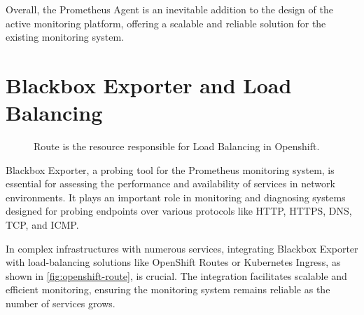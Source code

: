 Overall, the Prometheus Agent is an inevitable addition to the design of the active monitoring platform, offering a scalable and reliable solution for the existing monitoring system.

\section{Blackbox Exporter and Load Balancing}

\begin{figure}[htpb]
  \centering
  \caption[Openshift Route]{Route is the resource responsible for Load Balancing in Openshift.}\label{fig:openshift-route}
\end{figure}

Blackbox Exporter, a probing tool for the Prometheus monitoring system, is essential for assessing the performance and availability of services in network environments. It plays an important role in monitoring and diagnosing systems designed for probing endpoints over various protocols like HTTP, HTTPS, DNS, TCP, and ICMP. 

In complex infrastructures with numerous services, integrating Blackbox Exporter with load-balancing solutions like OpenShift Routes or Kubernetes Ingress, as shown in \autoref{fig:openshift-route}, is crucial. The integration facilitates scalable and efficient monitoring, ensuring the monitoring system remains reliable as the number of services grows. 

